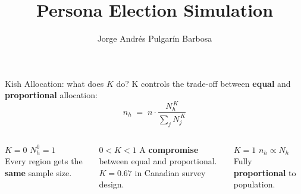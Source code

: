 \documentclass[aspectratio=169,11pt]{beamer}
\title{Persona Election Simulation}
\author{Jorge Andrés Pulgarín Barbosa}
\institute{University of Tübingen}
\date{}
\begin{document}
	
	\maketitle
	
	\begin{frame}{Kish Allocation: what does $K$ do?}
		K controls the trade-off between \textbf{equal} and
		\textbf{proportional} allocation:
		\[
		\boxed{\;n_h \;=\; n \cdot
			\frac{N_h^{\,K}}{\displaystyle\sum_j N_j^{\,K}}\;}
		\]
		\vspace{0.3em}
		\begin{columns}[t]
			\begin{block}{$K = 0$}
				$N_h^{0}=1$ \\
				Every region gets the \textbf{same} sample size.
			\end{block}
			\begin{block}{$0 < K < 1$}
				A \textbf{compromise} between equal and proportional.\\[0.3em]
				\small\color{amber}$K=0.67$ in Canadian survey design.
			\end{block}
			\begin{block}{$K = 1$}
				$n_h \propto N_h$ \\
				Fully \textbf{proportional} to population.
			\end{block}
		\end{columns}
	\end{frame}
	
\end{document}

